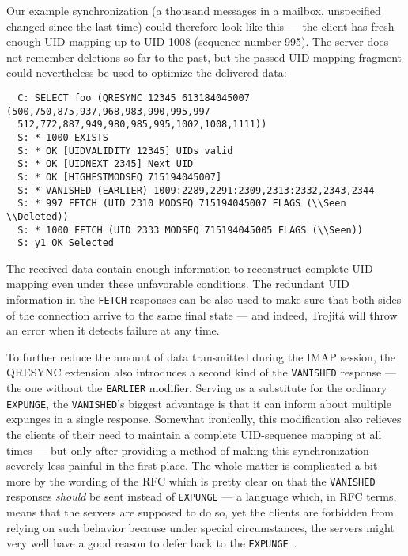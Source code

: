 \documentclass[trojita]{subfiles}
\begin{document}
Our example synchronization (a thousand messages in a mailbox, unspecified changed since the last time) could therefore
look like this --- the client has fresh enough UID mapping up to UID 1008 (sequence number 995).  The server does not
remember deletions so far to the past, but the passed UID mapping fragment could nevertheless be used to optimize the
delivered data:

\begin{verbatim}
  C: SELECT foo (QRESYNC 12345 613184045007 (500,750,875,937,968,983,990,995,997
  512,772,887,949,980,985,995,1002,1008,1111))
  S: * 1000 EXISTS
  S: * OK [UIDVALIDITY 12345] UIDs valid
  S: * OK [UIDNEXT 2345] Next UID
  S: * OK [HIGHESTMODSEQ 715194045007]
  S: * VANISHED (EARLIER) 1009:2289,2291:2309,2313:2332,2343,2344
  S: * 997 FETCH (UID 2310 MODSEQ 715194045007 FLAGS (\\Seen \\Deleted))
  S: * 1000 FETCH (UID 2333 MODSEQ 715194045005 FLAGS (\\Seen))
  S: y1 OK Selected
\end{verbatim}

The received data contain enough information to reconstruct complete UID mapping even under these unfavorable
conditions.  The redundant UID information in the {\tt FETCH} responses can be also used to make sure that both sides of
the connection arrive to the same final state --- and indeed, Trojitá will throw an error when it detects failure at any
time.

To further reduce the amount of data transmitted during the IMAP session, the QRESYNC extension also introduces a second
kind of the {\tt VANISHED} response --- the one without the {\tt EARLIER} modifier.  Serving as a substitute for the
ordinary {\tt EXPUNGE}, the {\tt VANISHED}'s biggest advantage is that it can inform about multiple expunges in a single
response.  Somewhat ironically, this modification also relieves the clients of their need to maintain a complete
UID-sequence mapping at all times --- but only after providing a method of making this synchronization severely less
painful in the first place.  The whole matter is complicated a bit more by the wording of the RFC which is pretty clear
on that the {\tt VANISHED} responses {\em should} be sent instead of {\tt EXPUNGE} --- a language which, in RFC terms,
means that the servers are supposed to do so, yet the clients are forbidden from relying on such behavior because under
special circumstances, the servers might very well have a good reason to defer back to the {\tt EXPUNGE}~\cite{rfc2119}.
\end{document}
